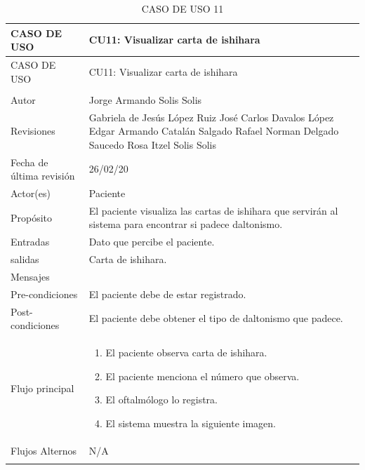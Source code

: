 \documentclass[10pt]{article}
\begin{document}
\newpage 

\begin{longtable}{|p{3.8cm}|p{10.8cm}|}
\hline
CASO DE USO & CU11: Visualizar carta de ishihara\\
\hline 
\endfirsthead

\hline

CASO DE USO & CU11: Visualizar carta de ishihara\\
\hline 
\endhead

\multicolumn{2}{c}{}
\endfoot

\endlastfoot
\hline
versión & 1\\
\hline
Autor & Jorge Armando Solis Solis\\
\hline
Revisiones & Gabriela de Jesús López Ruiz\newline
José Carlos Davalos López\newline
Edgar Armando Catalán Salgado\newline
Rafael Norman Delgado Saucedo\newline
Rosa Itzel Solis Solis
\\

\hline
Fecha de última revisión & 26/02/20\\
\hline
Actor(es) & Paciente\\
\hline
Propósito & El paciente visualiza las cartas de ishihara que servirán al sistema para encontrar si padece daltonismo.\\
\hline
Entradas & Dato que percibe el paciente.\\
\hline
salidas & Carta de ishihara.\\
\hline
Mensajes & \\
\hline
Pre-condiciones & El paciente debe de estar registrado.\\
\hline
Post-condiciones & El paciente debe obtener el tipo de daltonismo que padece.\\
\hline
Flujo principal & \begin{enumerate}
    \item El paciente observa carta de ishihara.
    \item El paciente menciona el número que observa.
    \item El oftalmólogo lo registra.
    \item El sistema muestra la siguiente imagen.
\end{enumerate}
    \\
\hline
Flujos Alternos & 
    N/A\\
\hline
\caption{CASO DE USO 11}
\label{tabla1}
\end{longtable}
\end{document}
